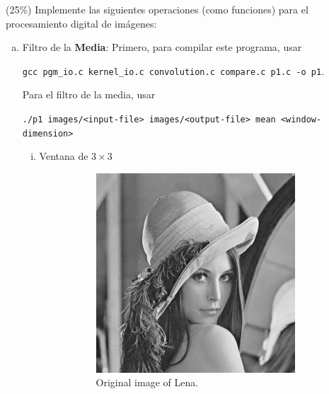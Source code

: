 \documentclass{article}
\theoremstyle{problemstyle}
\begin{document}
\begin{problem}
(25\%) Implemente las siguientes operaciones (como funciones) para el procesamiento digital de im\'agenes:
\begin{enumerate}[a)]
	\item Filtro de la \textbf{Media}: 
    Primero, para compilar este programa, usar


    \texttt{gcc pgm\_io.c kernel\_io.c convolution.c compare.c p1.c -o p1}.

    Para el filtro de la media, usar

    \texttt{./p1 images/<input-file> images/<output-file> mean <window-dimension>}
	      \begin{enumerate}[i)]
		      \item Ventana de $ 3\times 3 $
		            \begin{figure}[H]
			            \begin{subfigure}{.45\textwidth}
				            \centering
				            \includegraphics[width=0.95\textwidth]{lena_ascii.png}
				            \caption{Original image of Lena.}
			            \end{subfigure}
			            \hfill
			            \begin{subfigure}{.45\textwidth}
				            \centering

\end{subfigure}
\end{figure}
\end{enumerate}
\end{enumerate}
\end{problem}
\end{document}
